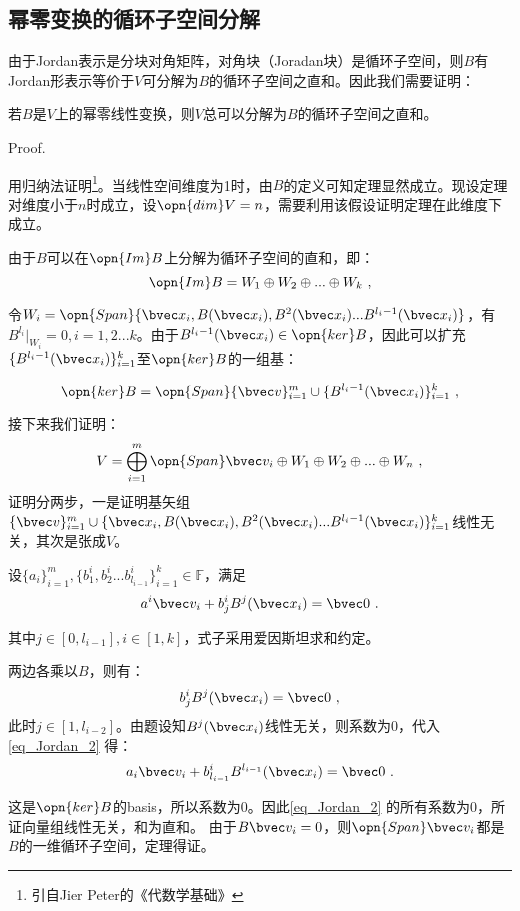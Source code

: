 \subsection{幂零变换的循环子空间分解}

由于Jordan表示是分块对角矩阵，对角块（Joradan块）是循环子空间，则$B$有Jordan形表示等价于$V$可分解为$B$的循环子空间之直和。因此我们需要证明：

\begin{theorem}{}\label{the_Jordan_1}
若$B$是$V$上的幂零线性变换，则$V$总可以分解为$B$的循环子空间之直和。
\end{theorem}
Proof.

用归纳法证明\footnote{引自Jier Peter的《代数学基础》}。当线性空间维度为1时，由$B$的定义可知定理显然成立。现设定理对维度小于$n$时成立，设$\opn{dim}V=n$，需要利用该假设证明定理在此维度下成立。

由于$B$可以在$\opn{Im}B$上分解为循环子空间的直和，即：
\begin{equation}
\opn{Im}B=W_1\oplus W_2\oplus...\oplus W_k~,
\end{equation}

令$W_i=\opn{Span}\{\bvec x_i,B(\bvec x_i),B^2(\bvec x_i)...B^{l_i-1}(\bvec x_i)\}$，有$B^{l_i}|_{W_i}=0,i=1,2...k$。由于$B^{l_i-1}(\bvec x_i)\in \opn{ker}B$，因此可以扩充$\{B^{l_i-1}(\bvec x_i)\}^k_{i=1}$至$\opn{ker}B$的一组基：

\begin{equation}
\opn{ker}B=\opn{Span}\{\bvec v\}^m_{i=1}\cup \{B^{l_i-1}(\bvec x_i)\}^k_{i=1}~,
\end{equation}

接下来我们证明：
\begin{equation}
V=\bigoplus ^m_{i=1}\opn{Span}\bvec v_i\oplus W_1\oplus W_2\oplus...\oplus W_n~,
\end{equation}
证明分两步，一是证明基矢组$\{\bvec v\}^m_{i=1}\cup \{\bvec x_i,B(\bvec x_i),B^2(\bvec x_i)...B^{l_i-1}(\bvec x_i)\}^{k}_{i=1}$线性无关，其次是张成$V$。

设$\{a_i\}^m_{i=1},\{b^i_1,b^i_2...b^i_{l_{i-1}}\}^{k}_{i=1}\in\mathbb F$，满足
\begin{equation}\label{eq_Jordan_2}
a^i\bvec v_i+b^i_jB^{j}(\bvec x_i)=\bvec 0~.
\end{equation}

其中$j\in[0,l_{i-1}],i\in[1,k]$，式子采用爱因斯坦求和约定。

两边各乘以$B$，则有：
\begin{equation}
b^i_jB^{j}(\bvec x_i)=\bvec 0~,
\end{equation}
此时$j\in[1,l_{i-2}]$。由题设知$B^j(\bvec x_i)$线性无关，则系数为$0$，代入\autoref{eq_Jordan_2} 得：
\begin{equation}
a_i\bvec v_i+b^i_{l_{i-1}}B^{l_{i-1}}(\bvec x_i)=\bvec 0~.
\end{equation}

这是$\opn{ker}B$的basis，所以系数为$0$。因此\autoref{eq_Jordan_2} 的所有系数为0，所证向量组线性无关，和为直和。
由于$B\bvec v_i=0$，则$\opn{Span}\bvec v_i$都是$B$的一维循环子空间，定理得证。


